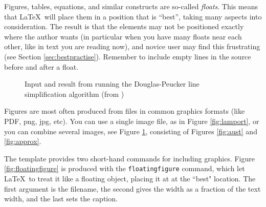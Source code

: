 Figures, tables, equations, and similar constructs are so-called {\em floats}. This means that \LaTeX\ will place them in a position that is ``best'', taking many aspects into consideration. The result is that the elements may not be positioned exactly where the author wants (in particular when you have many floats near each other, like in text you are reading now), and novice user may find this frustrating (see Section \ref{sec:bestpractise}). Remember to include empty lines in the source before and after a float.

\begin{figure}[!htbp]
  \begin{center}
  \end{center}
  \caption{Input and result from running the Douglas-Peucker line simplification algorithm (from  \cite{kjeldsen05cor})}
  \label{fig:dpaustralia}
\end{figure}

Figures are most often produced from files in common graphics formats (like PDF, png, jpg, etc). You can use a single image file, as in Figure \ref{fig:lamport}, or you can combine several images, see Figure \ref{fig:dpaustralia}, consisting of Figures \ref{fig:aust} and \ref{fig:approx}.

The template provides two short-hand commands for including graphics. Figure \ref{fig:floatingfigure} is produced with the \texttt{floatingfigure} command, which let \LaTeX\ to treat it like a floating object, placing it at at the ``best" location. The first argument is the filename, the second gives the width as a fraction of the text width, and the last sets the caption.

